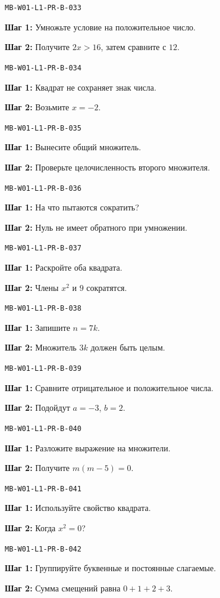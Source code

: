 \documentclass[11pt,a4paper,openany]{book}
\newcommand{\muid}[1]{\texttt{\footnotesize #1}}
\begin{document}
\noindent\muid{MB-W01-L1-PR-B-033}\par 
\textbf{Шаг 1:} Умножьте условие на положительное число.\par \textbf{Шаг 2:} Получите $2x>16$, затем сравните с $12$.\smallskip

\noindent\muid{MB-W01-L1-PR-B-034}\par 
\textbf{Шаг 1:} Квадрат не сохраняет знак числа.\par \textbf{Шаг 2:} Возьмите $x=-2$.\smallskip

\noindent\muid{MB-W01-L1-PR-B-035}\par 
\textbf{Шаг 1:} Вынесите общий множитель.\par \textbf{Шаг 2:} Проверьте целочисленность второго множителя.\smallskip

\noindent\muid{MB-W01-L1-PR-B-036}\par 
\textbf{Шаг 1:} На что пытаются сократить?\par \textbf{Шаг 2:} Нуль не имеет обратного при умножении.\smallskip

\noindent\muid{MB-W01-L1-PR-B-037}\par 
\textbf{Шаг 1:} Раскройте оба квадрата.\par \textbf{Шаг 2:} Члены $x^2$ и $9$ сократятся.\smallskip

\noindent\muid{MB-W01-L1-PR-B-038}\par 
\textbf{Шаг 1:} Запишите $n=7k$.\par \textbf{Шаг 2:} Множитель $3k$ должен быть целым.\smallskip

\noindent\muid{MB-W01-L1-PR-B-039}\par 
\textbf{Шаг 1:} Сравните отрицательное и положительное числа.\par \textbf{Шаг 2:} Подойдут $a=-3$, $b=2$.\smallskip

\noindent\muid{MB-W01-L1-PR-B-040}\par 
\textbf{Шаг 1:} Разложите выражение на множители.\par \textbf{Шаг 2:} Получите $m(m-5)=0$.\smallskip

\noindent\muid{MB-W01-L1-PR-B-041}\par 
\textbf{Шаг 1:} Используйте свойство квадрата.\par \textbf{Шаг 2:} Когда $x^2=0$?\smallskip

\noindent\muid{MB-W01-L1-PR-B-042}\par 
\textbf{Шаг 1:} Группируйте буквенные и постоянные слагаемые.\par \textbf{Шаг 2:} Сумма смещений равна $0+1+2+3$.\smallskip
\end{document}

